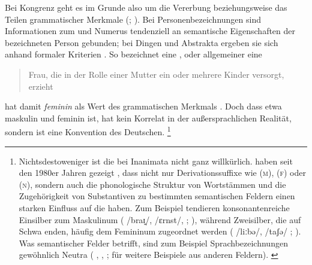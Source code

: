 Bei Kongrenz geht es im Grunde also um die Vererbung beziehungsweise das Teilen
grammatischer Merkmale (; \cite{corbett2012}). Bei
Personenbezeichnungen sind Informationen zum  und Numerus
tendenziell an semantische Eigenschaften der bezeichneten Person
gebunden; bei Dingen und Abstrakta ergeben sie sich anhand
formaler Kriterien \autocites[vgl.][2--4,
125--132]{corbett2006}{koepckezubin2017}. So bezeichnet
 eine ,
oder allgemeiner eine \blockcquote[s.\,v.~]{duden-online}{Frau, die
in der Rolle einer Mutter ein oder mehrere Kinder versorgt, erzieht}.
 hat damit \emph{feminin} als Wert des grammatischen Merkmals
\emph{}. Doch dass etwa  maskulin und  feminin
ist, hat kein Korrelat in der außersprachlichen Realität, sondern ist eine
Konvention des Deutschen.%
%
	\footnote{Nichtsdestoweniger ist die  bei Inanimata
		nicht ganz willkürlich. \citeauthor{koepckezubin2017} haben seit den
		1980er Jahren gezeigt
		\autocites[z.\,B.][]%
			{koepcke1982}%
			{koepckezubin1996}%
			{koepckezubin2009}%
			{koepckezubin2017},
		dass nicht nur Derivationssuffixe wie
			 (\textsc{m}),
			 (\textsc{f}) oder
			 (\textsc{n}),
		sondern auch die phonologische Struktur von Wortstämmen und die
		Zugehörigkeit von Substantiven zu bestimmten semantischen Feldern einen
		starken Einfluss auf die  haben. Zum Beispiel
		tendieren konsonantenreiche Einsilber zum Maskulinum (%
			 /braɪ̯/,
			/ɛrnst/,
			;
		\cite[vgl.][475--479]{koepckezubin1996}), während Zweisilber, die auf
		Schwa enden, häufig dem Femininum zugeordnet werden (%
			 /liːbə/,
			/taʃə/%
			;
		\cite[vgl.][207--209]{koepckezubin2017}). Was semantischer Felder
		betrifft, sind zum Beispiel Sprachbezeichnungen gewöhnlich Neutra (%
			,
			,
			;
		\cites[siehe]%
			[480]{koepckezubin1996}%
			[137--139]{koepckezubin2009}%
			[210--214]{koepckezubin2017}
		für weitere Beispiele aus anderen Feldern).%
		\label{fn:koepckezubin}
	}

